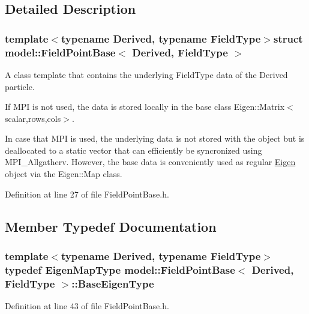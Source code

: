 \subsection{Detailed Description}
\subsubsection*{template$<$typename Derived, typename Field\+Type$>$struct model\+::\+Field\+Point\+Base$<$ Derived, Field\+Type $>$}

A class template that contains the underlying Field\+Type data of the Derived particle. 

If M\+P\+I is not used, the data is stored locally in the base class Eigen\+::\+Matrix$<$scalar,rows,cols$>$.

In case that M\+P\+I is used, the underlying data is not stored with the object but is deallocated to a static vector that can efficiently be syncronized using M\+P\+I\+\_\+\+Allgatherv. However, the base data is conveniently used as regular \hyperlink{namespace_eigen}{Eigen} object via the Eigen\+::\+Map class. 

Definition at line 27 of file Field\+Point\+Base.\+h.



\subsection{Member Typedef Documentation}
\hypertarget{structmodel_1_1_field_point_base_a40049730fe4abdfa3cff40d66f7d4ce5}{}
\subsubsection[{Base\+Eigen\+Type}]{\setlength{\rightskip}{0pt plus 5cm}template$<$typename Derived, typename Field\+Type$>$ typedef {\bf Eigen\+Map\+Type} {\bf model\+::\+Field\+Point\+Base}$<$ Derived, Field\+Type $>$\+::{\bf Base\+Eigen\+Type}}\label{structmodel_1_1_field_point_base_a40049730fe4abdfa3cff40d66f7d4ce5}


Definition at line 43 of file Field\+Point\+Base.\+h.

\hypertarget{structmodel_1_1_field_point_base_aa9d600abaa521d1bbc6357203da99dde}{}
